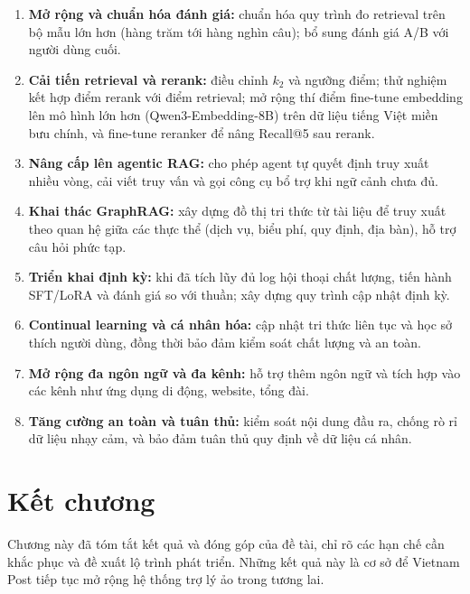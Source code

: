 \begin{enumerate}
  \item \textbf{Mở rộng và chuẩn hóa đánh giá:} chuẩn hóa quy trình đo retrieval trên bộ mẫu
  lớn hơn (hàng trăm tới hàng nghìn câu); bổ sung đánh giá A/B với người dùng cuối.
  \item \textbf{Cải tiến retrieval và rerank:} điều chỉnh $k_2$ và ngưỡng điểm; thử
  nghiệm kết hợp điểm rerank với điểm retrieval; mở rộng thí điểm fine-tune embedding lên mô
  hình lớn hơn (Qwen3-Embedding-8B) trên dữ liệu tiếng Việt miền bưu chính, và fine-tune
  reranker để nâng Recall@5 sau rerank.
  \item \textbf{Nâng cấp lên agentic RAG:} cho phép agent tự quyết định truy xuất nhiều vòng,
  cải viết truy vấn và gọi công cụ bổ trợ khi ngữ cảnh chưa đủ.
  \item \textbf{Khai thác GraphRAG:} xây dựng đồ thị tri thức từ tài liệu để truy xuất theo
  quan hệ giữa các thực thể (dịch vụ, biểu phí, quy định, địa bàn), hỗ trợ câu hỏi phức tạp.
  \item \textbf{Triển khai \ft{} định kỳ:} khi đã tích lũy đủ log hội thoại chất lượng, tiến
  hành SFT/LoRA và đánh giá so với \rag{} thuần; xây dựng quy trình cập nhật định kỳ.
  \item \textbf{Continual learning và cá nhân hóa:} cập nhật tri thức liên tục và học sở
  thích người dùng, đồng thời bảo đảm kiểm soát chất lượng và an toàn.
  \item \textbf{Mở rộng đa ngôn ngữ và đa kênh:} hỗ trợ thêm ngôn ngữ và tích hợp vào các
  kênh như ứng dụng di động, website, tổng đài.
  \item \textbf{Tăng cường an toàn và tuân thủ:} kiểm soát nội dung đầu ra, chống rò rỉ dữ
  liệu nhạy cảm, và bảo đảm tuân thủ quy định về dữ liệu cá nhân.
\end{enumerate}

\section*{Kết chương}
Chương này đã tóm tắt kết quả và đóng góp của đề tài, chỉ rõ các hạn chế cần khắc phục và
đề xuất lộ trình phát triển. Những kết quả này là cơ sở để Vietnam Post tiếp tục mở rộng hệ thống
trợ lý ảo trong tương lai.
